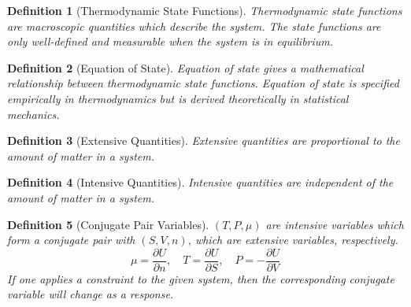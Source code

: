 \documentclass[a4paper]{article}
\newtheorem{defi}{Definition}[section]
\theoremstyle{new}
\begin{document}
\begin{defi}[Thermodynamic State Functions]
Thermodynamic state functions are macroscopic quantities which describe the system. The state functions are only well-defined and measurable when the system is in equilibrium.
\end{defi}
\begin{defi}[Equation of State]
Equation of state gives a mathematical relationship between thermodynamic state functions. Equation of state is specified empirically in thermodynamics but is derived theoretically in statistical mechanics.
\end{defi}
\begin{defi}[Extensive Quantities]
Extensive quantities are proportional to the amount of matter in a system.
\end{defi}
\begin{defi}[Intensive Quantities]
Intensive quantities are independent of the amount of matter in a system.
\end{defi}
\begin{defi}[Conjugate Pair Variables]
$(T,P,\mu)$ are intensive variables which form a conjugate pair with $(S,V,n)$, which are extensive variables, respectively. 
$$\mu=\frac{\partial U}{\partial n},\quad T=\frac{\partial U}{\partial S},\quad P=-\frac{\partial U}{\partial V}$$
If one applies a constraint to the given system, then the corresponding conjugate variable will change as a response.
\end{defi}
\newpage
\end{document}
